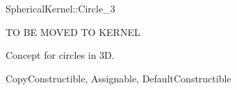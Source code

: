 
\begin{ccRefConcept}{SphericalKernel::Circle_3}

TO BE MOVED TO KERNEL

Concept for circles in 3D.

\ccRefines
CopyConstructible, Assignable, DefaultConstructible

\ccHasModels
{}
\end{ccRefConcept}
